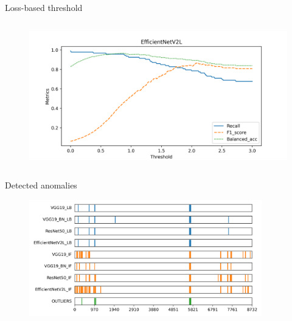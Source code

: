 \documentclass[aspectratio=169]{beamer}
\begin{document}
\begin{frame}{Loss-based threshold}
\begin{columns}
\begin{column}{0.45\textwidth}
\begin{figure}
                \includegraphics[width=\columnwidth]{./results/comparison/EfficientNetV2L_threshold.png}
            \end{figure}
        \end{column}
    \end{columns}
\end{frame}

\begin{frame}{Detected anomalies}
    \begin{figure}
        \centering
        \includegraphics[width=0.9\textwidth]{./results/comparison/outlier_comparison.png}
    \end{figure}
\end{frame}
\end{document}
